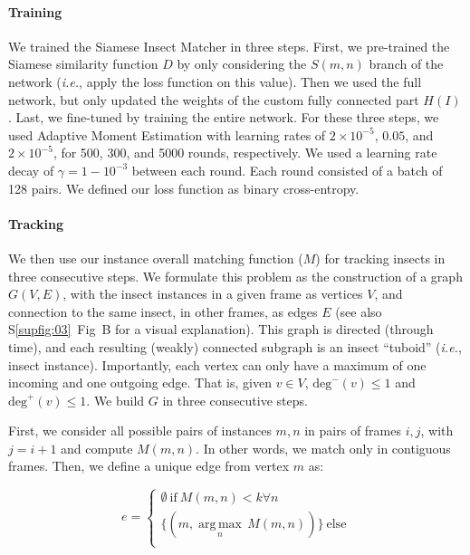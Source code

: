 \documentclass[12pt]{article}
\begin{document}
\begin{linenumbers}
		\paragraph{Training}
		We trained the Siamese Insect Matcher in three steps. First, we pre-trained the Siamese similarity function $D$ by only considering the $S(m,n)$ branch of the network (\emph{i.e.}, apply the loss function on this value). Then we used the full network, but only updated the weights of the custom fully connected part $H(I)$. Last, we fine-tuned by training the entire network. For these three steps, we used Adaptive Moment Estimation with learning rates of $2\times{}10^{-5}$, $0.05$, and $2\times{}10^{-5}$, for 500, 300, and 5000 rounds, respectively. We used a learning rate decay of $\gamma = 1- 10^{-3}$ between each round. Each round consisted of a batch of 128 pairs. We defined our loss function as binary cross-entropy.
		
		\paragraph{Tracking}
		We then use our instance overall matching function ($M$) for tracking insects in three consecutive steps. We formulate this problem as the construction of a graph $G(V, E)$, with the insect instances in a given frame as vertices $V$, and connection to the same insect, in other frames, as edges $E$ (see also S\ref{supfig:03}~Fig~B for a visual explanation). This graph is directed (through time), and each resulting (weakly) connected subgraph is an insect “tuboid” (\emph{i.e.}, insect instance). Importantly, each vertex can only have a maximum of one incoming and one outgoing edge. That is, given $v \in V$, $\text{deg}^-(v) \le 1$ and $\text{deg}^+(v) \le 1$. We build $G$ in three consecutive steps. 
		
		First, we consider all possible pairs of instances $m, n$ in pairs of frames $i, j$, with $j=i+1$ and compute $M(m,n)$. In other words, we match only in contiguous frames. Then, we define a unique edge from vertex $m$ as:
		
		\begin{equation}
			\label{eq:01}
			e = \begin{cases}
				\emptyset~\text{if}~M(m,n)<k \forall n \\
				\{(m, \underset{n}{\operatorname{arg\,max}}\,M(m,n))\}~\text{else} \\
			\end{cases}
		\end{equation}
		

\end{linenumbers}
\end{document}
